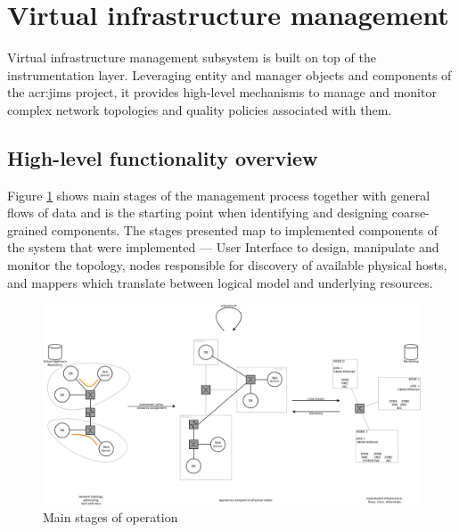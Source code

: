 \documentclass[11pt]{book}
\begin{document}
    \section{Virtual infrastructure management}
    \label{sec:arch:vi}

      Virtual infrastructure management subsystem is built on top of the instrumentation layer. Leveraging entity and
      manager objects and components of the \gls{acr:jims} project, it provides high-level mechanisms to manage and monitor
      complex network topologies and quality policies associated with them.


      \subsection{High-level functionality overview}
      \label{sub:arch:hl}

        Figure \ref{fig:arch:hl} shows main stages of the management process together with general flows of data and is
        the starting point when identifying and designing coarse-grained components. The stages presented map to
        implemented components of the system that were implemented --- User Interface to design, manipulate and monitor
        the topology, nodes responsible for discovery of available physical hosts, and mappers which translate between
        logical model and underlying resources.

        \begin{figure}[H]
          \begin{center}
            \includegraphics[width=\textwidth]{img/architecture/scope.pdf}
          \end{center}

          \caption{Main stages of operation}
          \label{fig:arch:hl}
        \end{figure}
\end{document}
